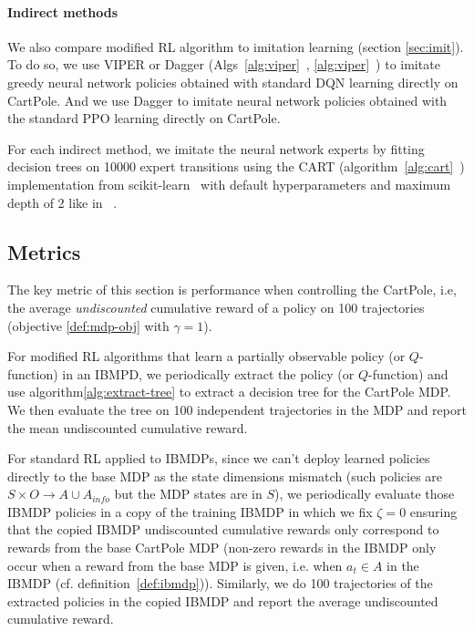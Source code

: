 \paragraph{Indirect methods} We also compare modified RL algorithm to imitation learning (section \ref{sec:imit}).
To do so, we use VIPER or Dagger (Algs~\ref{alg:viper}~\cite{dagger}, \ref{alg:viper}~\cite{viper}) to imitate greedy neural network policies obtained with standard DQN learning directly on CartPole.
And we use Dagger to imitate neural network policies obtained with the standard PPO learning directly on CartPole. 

For each indirect method, we imitate the neural network experts by fitting decision trees on 10000 expert transitions using the CART (algorithm~\ref{alg:cart}~\cite{breiman1984classification}) implementation from scikit-learn~\cite{scikit-learn} with default hyperparameters and maximum depth of 2 like in ~\cite{topin2021iterative}.
    
\subsection{Metrics}
The key metric of this section is performance when controlling the CartPole, i.e, the average \textit{undiscounted} cumulative reward of a policy on 100 trajectories (objective \ref{def:mdp-obj} with $\gamma=1$).

For modified RL algorithms that learn a partially observable policy (or $Q$-function) in an IBMPD, we periodically extract the policy (or $Q$-function) and use algorithm\ref{alg:extract-tree} to extract a decision tree for the CartPole MDP. 
We then evaluate the tree on 100 independent trajectories in the MDP and report the mean undiscounted cumulative reward.

For standard RL applied to IBMDPs, since we can't deploy learned policies directly to the base MDP as the state dimensions mismatch (such policies are $S\times O\rightarrow A \cup A_{info}$ but the MDP states are in $S$), we periodically evaluate those IBMDP policies in a copy of the training IBMDP in which we fix $\zeta=0$ ensuring that the copied IBMDP undiscounted cumulative rewards only correspond to rewards from the base CartPole MDP (non-zero rewards in the IBMDP only occur when a reward from the base MDP is given, i.e. when $a_t\in A$ in the IBMDP (cf. definition~\ref{def:ibmdp})).
Similarly, we do 100 trajectories of the extracted policies in the copied IBMDP and report the average undiscounted cumulative reward.

